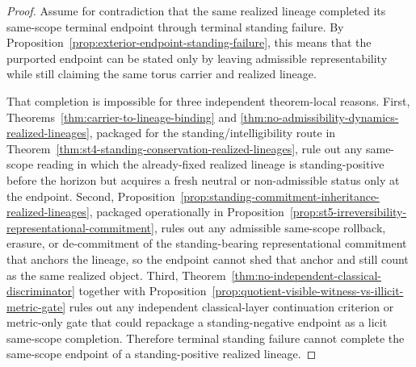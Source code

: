 \begin{proof}
Assume for contradiction that the same realized lineage completed its same-scope terminal endpoint through terminal standing failure. By Proposition~\ref{prop:exterior-endpoint-standing-failure}, this means that the purported endpoint can be stated only by leaving admissible representability while still claiming the same torus carrier and realized lineage.

That completion is impossible for three independent theorem-local reasons. First, Theorems~\ref{thm:carrier-to-lineage-binding} and \ref{thm:no-admissibility-dynamics-realized-lineages}, packaged for the standing/intelligibility route in Theorem~\ref{thm:st4-standing-conservation-realized-lineages}, rule out any same-scope reading in which the already-fixed realized lineage is standing-positive before the horizon but acquires a fresh neutral or non-admissible status only at the endpoint. Second, Proposition~\ref{prop:standing-commitment-inheritance-realized-lineages}, packaged operationally in Proposition~\ref{prop:st5-irreversibility-representational-commitment}, rules out any admissible same-scope rollback, erasure, or de-commitment of the standing-bearing representational commitment that anchors the lineage, so the endpoint cannot shed that anchor and still count as the same realized object. Third, Theorem~\ref{thm:no-independent-classical-discriminator} together with Proposition~\ref{prop:quotient-visible-witness-vs-illicit-metric-gate} rules out any independent classical-layer continuation criterion or metric-only gate that could repackage a standing-negative endpoint as a licit same-scope completion. Therefore terminal standing failure cannot complete the same-scope endpoint of a standing-positive realized lineage.
\end{proof}

